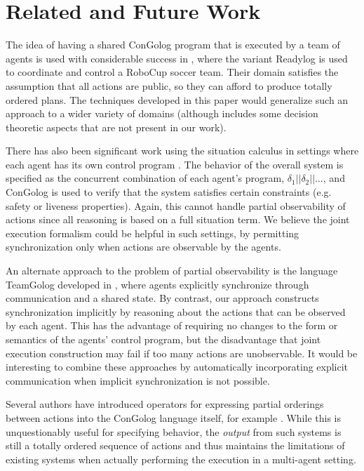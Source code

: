 \section{Related and Future Work}

\label{sec:Related-Work}

The idea of having a shared ConGolog program that is executed by a
team of agents is used with considerable success in \citep{Ferrein2005readylog},
where the variant Readylog is used to coordinate and control a RoboCup
soccer team. Their domain satisfies the assumption that all actions
are public, so they can afford to produce totally ordered plans. The
techniques developed in this paper would generalize such an approach
to a wider variety of domains (although \citep{Ferrein2005readylog}
includes some decision theoretic aspects that are not present in our
work).

There has also been significant work using the situation calculus
in settings where each agent has its own control program \citep{shapiro02casl}.
The behavior of the overall system is specified as the concurrent
combination of each agent's program, $\delta_{1}||\delta_{2}||\dots$,
and ConGolog is used to verify that the system satisfies certain constraints
(e.g. safety or liveness properties). Again, this cannot handle partial
observability of actions since all reasoning is based on a full situation
term. We believe the joint execution formalism could be helpful in
such settings, by permitting synchronization only when actions are
observable by the agents.

An alternate approach to the problem of partial observability is the
language TeamGolog developed in \citep{farinelli07team_golog}, where
agents explicitly synchronize through communication and a shared state.
By contrast, our approach constructs synchronization implicitly by
reasoning about the actions that can be observed by each agent. This
has the advantage of requiring no changes to the form or semantics
of the agents' control program, but the disadvantage that joint execution
construction may fail if too many actions are unobservable. It would
be interesting to combine these approaches by automatically incorporating
explicit communication when implicit synchronization is not possible.

Several authors have introduced operators for expressing partial orderings
between actions into the ConGolog language itself, for example \citep{son00htn_golog}.
While this is unquestionably useful for specifying behavior, the \emph{output}
from such systems is still a totally ordered sequence of actions and
thus maintains the limitations of existing systems when actually performing
the execution in a multi-agent setting.

